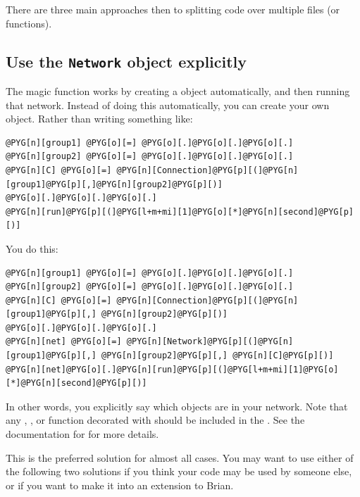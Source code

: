 \documentclass[letterpaper,10pt,english]{manual}
\begin{document}
There are three main approaches then to splitting code over multiple
files (or functions).

\hypertarget{index-121}{}\subsection{Use the \texttt{Network} object explicitly}

The magic \hyperlink{brian.run}{} function works by creating a \hyperlink{brian.Network}{}
object automatically, and then running that network. Instead of doing
this automatically, you can create your own \hyperlink{brian.Network}{} object.
Rather than writing something like:

\begin{Verbatim}[commandchars=@\[\]]
@PYG[n][group1] @PYG[o][=] @PYG[o][.]@PYG[o][.]@PYG[o][.]
@PYG[n][group2] @PYG[o][=] @PYG[o][.]@PYG[o][.]@PYG[o][.]
@PYG[n][C] @PYG[o][=] @PYG[n][Connection]@PYG[p][(]@PYG[n][group1]@PYG[p][,]@PYG[n][group2]@PYG[p][)]
@PYG[o][.]@PYG[o][.]@PYG[o][.]
@PYG[n][run]@PYG[p][(]@PYG[l+m+mi][1]@PYG[o][*]@PYG[n][second]@PYG[p][)]
\end{Verbatim}

You do this:

\begin{Verbatim}[commandchars=@\[\]]
@PYG[n][group1] @PYG[o][=] @PYG[o][.]@PYG[o][.]@PYG[o][.]
@PYG[n][group2] @PYG[o][=] @PYG[o][.]@PYG[o][.]@PYG[o][.]
@PYG[n][C] @PYG[o][=] @PYG[n][Connection]@PYG[p][(]@PYG[n][group1]@PYG[p][,] @PYG[n][group2]@PYG[p][)]
@PYG[o][.]@PYG[o][.]@PYG[o][.]
@PYG[n][net] @PYG[o][=] @PYG[n][Network]@PYG[p][(]@PYG[n][group1]@PYG[p][,] @PYG[n][group2]@PYG[p][,] @PYG[n][C]@PYG[p][)]
@PYG[n][net]@PYG[o][.]@PYG[n][run]@PYG[p][(]@PYG[l+m+mi][1]@PYG[o][*]@PYG[n][second]@PYG[p][)]
\end{Verbatim}

In other words, you explicitly say which objects are in your network.
Note that any \hyperlink{brian.NeuronGroup}{}, \hyperlink{brian.Connection}{},  or
function decorated with \hyperlink{brian.network_operation}{} should be included in the
\hyperlink{brian.Network}{}. See the documentation for \hyperlink{brian.Network}{} for more details.

This is the preferred solution for almost all cases. You may want to use either
of the following two solutions if you think your code may be used by someone
else, or if you want to make it into an extension to Brian.
\end{document}
